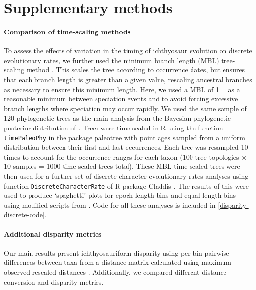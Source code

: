 \documentclass[british,a4paper]{article}
\begin{document}
\section{Supplementary methods}\label{supplemental-methods}

\paragraph{Comparison of time-scaling methods}\label{comparison-of-time-scaling-methods}

To assess the effects of variation in the timing of ichthyosaur evolution on
discrete evolutionary rates, we further used the minimum branch length (MBL)
tree-scaling method \autocite{Bapst2012MEE, Laurin2004SB}. This scales the
tree according to occurrence dates, but ensures that each branch length is
greater than a given value, rescaling ancestral branches as necessary to ensure
this minimum length. Here, we used a MBL of \SI{1}{\mega\annum} as a reasonable
minimum between speciation events and to avoid forcing excessive branch lengths
where speciation may occur rapidly. We used the same sample of 120 phylogenetic
trees as the main analysis from the Bayesian phylogenetic posterior distribution
of \textcite{Moon2018JSP}. Trees were time-scaled in R \autocite{RCoreTeam2019} using the
function \texttt{timePaleoPhy} in the package paleotree \autocite{Bapst2012MEE}
with point ages sampled from a uniform distribution between their first and last
occurrences. Each tree was resampled 10 times to account for the occurrence
ranges for each taxon (100 tree topologies × 10 samples = 1000 time-scaled trees
total). These MBL time-scaled trees were then used for a further set of discrete
character evolutionary rates analyses using function
\texttt{DiscreteCharacterRate} of R package Claddis \autocite{Lloyd2016BJLS}. The
results of this were used to produce `spaghetti' plots for epoch-length bins and
equal-length bins using modified scripts from \textcite{Close2015CB}. Code for
all these analyses is included in \cref{disparity-discrete-code}.

\paragraph{Additional disparity metrics}

Our main results present ichthyosauriform disparity using per-bin pairwise
differences between taxa from a distance matrix calculated using maximum
observed rescaled distances \autocite{Lloyd2016BJLS}. Additionally, we compared
different distance conversion and disparity metrics.
\end{document}
